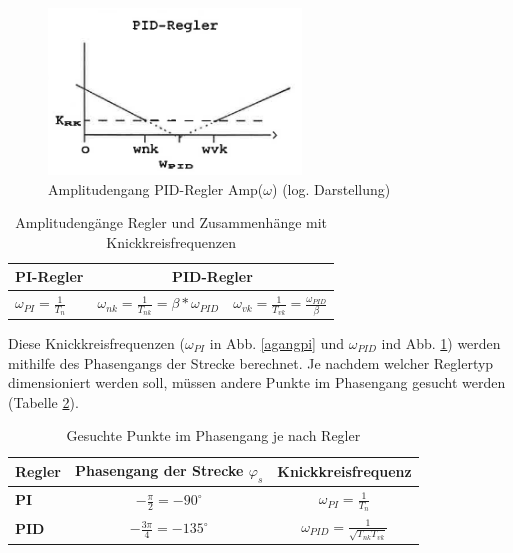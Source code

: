 \begin{figure}[h]
\centering
\includegraphics[width=0.6\textwidth]{agangpid.png}
\caption{Amplitudengang PID-Regler Amp($\omega$) (log. Darstellung)}
\label{agangpid}
\end{figure}

\begin{table}[h]
\centering
\renewcommand*{\arraystretch}{1.7}
\begin{tabular}{|l|l|c|}
\hline 
\textbf{PI-Regler} & \multicolumn{2}{c|}{\textbf{PID-Regler}} \\ 
\hline 
$\omega_{PI}=\frac{1}{T_n}$ & $\omega_{nk}=\frac{1}{T_{nk}}=\beta*\omega_{PID}$ & $\omega_{vk}=\frac{1}{T_{vk}}=\frac{\omega_{PID}}{\beta}$ \\ 
\hline 
\end{tabular}
\caption[Amplitudengänge / Knickkreisfrequenzen]{Amplitudengänge Regler und Zusammenhänge mit Knickkreisfrequenzen}
\label{amplitudengaenge}
\renewcommand*{\arraystretch}{1} 
\end{table}

\newpage
Diese Knickkreisfrequenzen ($\omega_{PI}$ in Abb. \ref{agangpi} und $\omega_{PID}$ ind Abb. \ref{agangpid}) werden mithilfe des Phasengangs der Strecke berechnet. Je nachdem welcher Reglertyp dimensioniert werden soll, müssen andere Punkte im Phasengang gesucht werden (Tabelle \ref{phgangpunkte}).\newline

\begin{table}[h]
\centering
\renewcommand*{\arraystretch}{1.7}
\begin{tabular}{|l|c|c|}
\hline 
\textbf{Regler} & \textbf{Phasengang der Strecke $\varphi_s$} & \textbf{Knickkreisfrequenz}  \\ 
\hline 
\textbf{PI} & $-\frac{\pi}{2}=-90^\circ$ & $\omega_{PI}=\frac{1}{T_n}$ \\ 
\hline 
\textbf{PID} & $-\frac{3\pi}{4}=-135^\circ$ & $\omega_{PID}=\frac{1}{\sqrt{T_{nk}T_{vk}}}$ \\ 
\hline 
\end{tabular}
\caption[Wichtige Phasengangpunkte]{Gesuchte Punkte im Phasengang je nach Regler}
\label{phgangpunkte}
\renewcommand*{\arraystretch}{1} 
\end{table}

